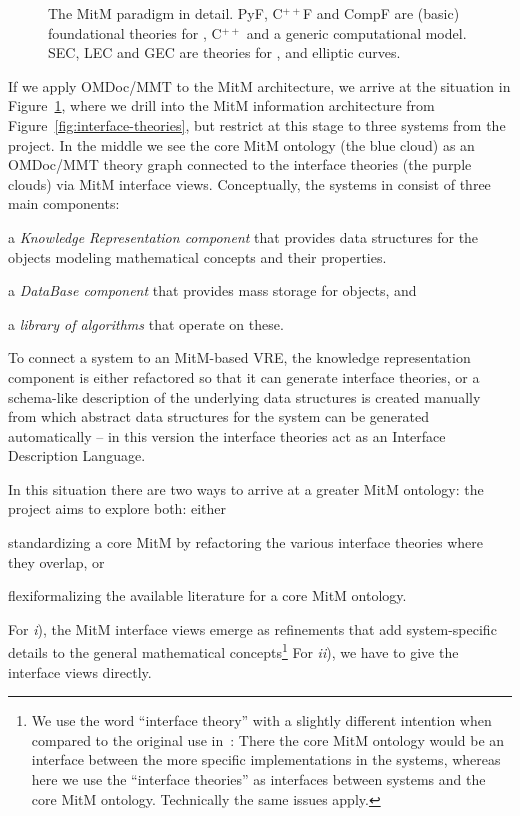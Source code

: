 \begin{figure}[ht]\centering
  
  \caption{The MitM paradigm in detail. PyF, C${}^{++}$F and CompF are (basic) foundational theories for \Python, C${}^{++}$ and a generic computational model. SEC, LEC and GEC are theories for \Sage, \LMFDB and \GAP elliptic curves.}\label{fig:mitm}
\end{figure}
If we apply OMDoc/MMT to the MitM architecture, we arrive at the situation in
Figure~\ref{fig:mitm}, where we drill into the MitM information architecture from
Figure~\ref{fig:interface-theories}, but restrict at this stage to three systems from the \ODK
project. In the middle we see the core MitM ontology (the blue cloud) as an OMDoc/MMT
theory graph connected to the interface theories (the purple clouds) via MitM
interface views. Conceptually, the systems in \ODK consist of three main components:
\begin{compactenum}[\em i\rm)]
\item a \emph{Knowledge Representation component} that provides data structures for the
      objects modeling mathematical concepts and their properties.
\item a \emph{DataBase component} that provides mass storage for objects, and 
\item a \emph{library of algorithms} that operate on these.
\end{compactenum}
To connect a system to an MitM-based VRE, the knowledge representation component is either
refactored so that it can generate interface theories, or a schema-like description of the
underlying data structures is created manually from which abstract data structures for the
system can be generated automatically -- in this version the interface theories act as an
Interface Description Language.

In this situation there are two ways to arrive at a greater MitM ontology: the \ODK
project aims to explore both: either
\begin{inparaenum}[\em i\rm)] 
\item standardizing a core MitM by refactoring the various interface theories where they
  overlap, or
\item flexiformalizing the available literature for a core MitM ontology.
\end{inparaenum}
For \emph{i}), the MitM interface views emerge as refinements that add system-specific details
to the general mathematical concepts\footnote{We use the word ``interface theory'' with a
slightly different intention when compared to the original use
in~\cite{KohRabSac:fvip11}: There the core MitM ontology would be an interface between
the more specific implementations in the systems, whereas here we use the ``interface
theories'' as interfaces between systems and the core MitM ontology. Technically the
same issues apply.} For \emph{ii}), we have to give the interface views directly. 

